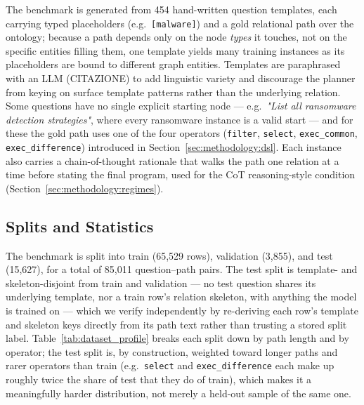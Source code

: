 The benchmark is generated from 454 hand-written question templates, each carrying typed placeholders (e.g.\ \texttt{[malware]}) and a gold relational path over the ontology; because a path depends only on the node \emph{types} it touches, not on the specific entities filling them, one template yields many training instances as its placeholders are bound to different graph entities. Templates are paraphrased with an LLM (CITAZIONE) to add linguistic variety and discourage the planner from keying on surface template patterns rather than the underlying relation. Some questions have no single explicit starting node --- e.g.\ \emph{"List all ransomware detection strategies"}, where every ransomware instance is a valid start --- and for these the gold path uses one of the four operators (\texttt{filter}, \texttt{select}, \texttt{exec\_common}, \texttt{exec\_difference}) introduced in Section~\ref{sec:methodology:dsl}. Each instance also carries a chain-of-thought rationale that walks the path one relation at a time before stating the final program, used for the CoT reasoning-style condition (Section~\ref{sec:methodology:regimes}).

\subsection{Splits and Statistics}
\label{sec:benchmark:splits}

The benchmark is split into train (65{,}529 rows), validation (3{,}855), and test (15{,}627), for a total of 85{,}011 question--path pairs. The test split is template- and skeleton-disjoint from train and validation --- no test question shares its underlying template, nor a train row's relation skeleton, with anything the model is trained on --- which we verify independently by re-deriving each row's template and skeleton keys directly from its path text rather than trusting a stored split label. Table~\ref{tab:dataset_profile} breaks each split down by path length and by operator; the test split is, by construction, weighted toward longer paths and rarer operators than train (e.g.\ \texttt{select} and \texttt{exec\_difference} each make up roughly twice the share of test that they do of train), which makes it a meaningfully harder distribution, not merely a held-out sample of the same one.

